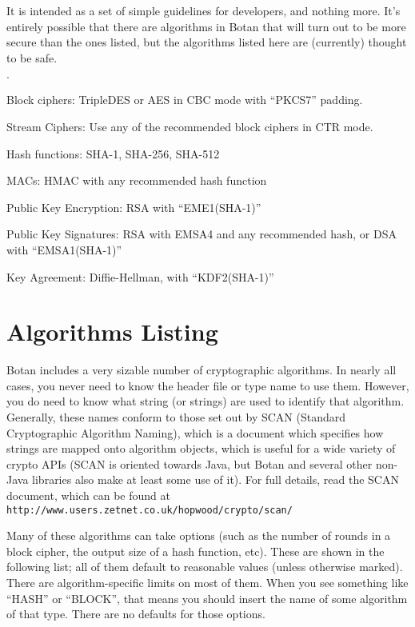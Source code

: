 \documentclass{article}
\newcommand{\url}[1]{\texttt{#1}}
\begin{document}
It is intended as a set of simple guidelines for developers, and nothing more.
It's entirely possible that there are algorithms in Botan that will turn out to
be more secure than the ones listed, but the algorithms listed here are
(currently) thought to be safe.

\begin{list}{$\cdot$}
  \item Block ciphers: TripleDES or AES in CBC mode with ``PKCS7'' padding.
  \item

  \item Stream Ciphers: Use any of the recommended block ciphers in CTR mode.

  \item Hash functions: SHA-1, SHA-256, SHA-512

  \item MACs: HMAC with any recommended hash function

  \item Public Key Encryption: RSA with ``EME1(SHA-1)''

  \item Public Key Signatures: RSA with EMSA4 and any recommended hash, or DSA
     with ``EMSA1(SHA-1)''

  \item Key Agreement: Diffie-Hellman, with ``KDF2(SHA-1)''
\end{list}

\pagebreak

\section{Algorithms Listing}

Botan includes a very sizable number of cryptographic algorithms. In
nearly all cases, you never need to know the header file or type name
to use them. However, you do need to know what string (or strings) are
used to identify that algorithm. Generally, these names conform to
those set out by SCAN (Standard Cryptographic Algorithm Naming), which
is a document which specifies how strings are mapped onto algorithm
objects, which is useful for a wide variety of crypto APIs (SCAN is
oriented towards Java, but Botan and several other non-Java libraries
also make at least some use of it). For full details, read the SCAN
document, which can be found at
\url{http://www.users.zetnet.co.uk/hopwood/crypto/scan/}

Many of these algorithms can take options (such as the number of
rounds in a block cipher, the output size of a hash function,
etc). These are shown in the following list; all of them default to
reasonable values (unless otherwise marked). There are
algorithm-specific limits on most of them. When you see something like
``HASH'' or ``BLOCK'', that means you should insert the name of some
algorithm of that type. There are no defaults for those options.
\end{document}
